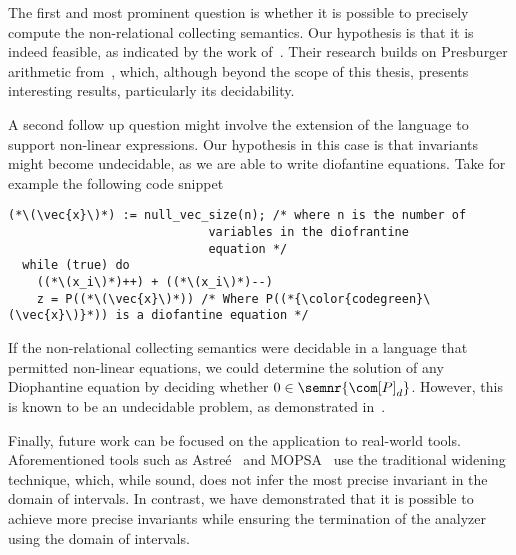 The first and most prominent question is whether it is possible to
precisely compute the non-relational collecting semantics. Our
hypothesis is that it is indeed feasible, as indicated by the work
of~\cite{Lefaucheux2024}. Their research builds on Presburger
arithmetic from~\cite{1571698599431503232}, which, although beyond the
scope of this thesis, presents interesting results, particularly its
decidability.

A second follow up question might involve the extension of the
language to support non-linear expressions. Our hypothesis in this
case is that invariants might become undecidable, as we are able to
write diofantine equations. Take for example the following code
snippet
\begin{lstlisting}[language=Imp, caption=Program with diofantine equations, label=code5]
  (*\(\vec{x}\)*) := null_vec_size(n); /* where n is the number of
                            variables in the diofrantine
                            equation */
  while (true) do
    ((*\(x_i\)*)++) + ((*\(x_i\)*)--)
    z = P((*\(\vec{x}\)*)) /* Where P((*{\color{codegreen}\(\vec{x}\)}*)) is a diofantine equation */
\end{lstlisting}
If the non-relational collecting semantics were decidable in a
language that permitted non-linear equations, we could determine the
solution of any Diophantine equation by deciding whether
\(0 \in \semnr{{\com[P]}_d}\). However, this is known to be an
undecidable problem, as demonstrated in~\cite{zbMATH03336816}.

Finally, future work can be focused on the application to real-world
tools. Aforementioned tools such as
Astreé~\cite{10.1007/978-3-540-31987-0_3} and
MOPSA~\cite{10.1007/978-3-031-30820-8_37} use the traditional widening
technique, which, while sound, does not infer the most precise
invariant in the domain of intervals. In contrast, we have
demonstrated that it is possible to achieve more precise invariants
while ensuring the termination of the analyzer using the domain of
intervals.
